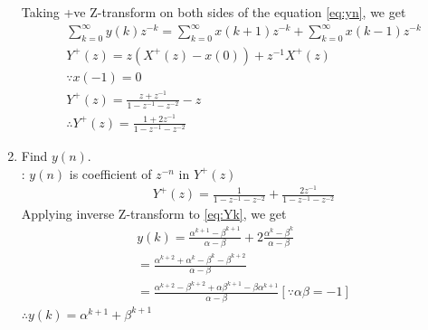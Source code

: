 \documentclass[journal,12pt,twocolumn]{IEEEtran}
\renewcommand\thesection{\arabic{section}}
\begin{document}
\begin{enumerate}[label=\thesection.\arabic*,ref=\thesection.\theenumi]
Taking +ve Z-transform on both sides of the equation \ref{eq:yn}, we get
\begin{align}
	&\sum_{k=0}^{\infty}y(k)z^{-k}=\sum_{k=0}^{\infty}x(k+1)z^{-k}+\sum_{k=0}^{\infty}x(k-1)z^{-k}\\
	&Y^{+}(z)=z(X^{+}(z)-x(0))+z^{-1}X^{+}(z)\\
	&\because x(-1)=0 \nonumber \\
	&Y^{+}(z)=\frac{z+z^{-1}}{1-z^{-1}-z^{-2}}-z\\
	&\therefore Y^{+}(z)=\frac{1+2z^{-1}}{1-z^{-1}-z^{-2}}
\end{align}
\item Find $y(n)$.\\
\solution:
 $y(n)$ is coefficient of $z^{-n}$ in $Y^{+}(z)$
\begin{align}
	\label{eq:Yk}
	&Y^{+}(z)=\frac{1}{1-z^{-1}-z^{-2}}+\frac{2z^{-1}}{1-z^{-1}-z^{-2}}
\end{align}
Applying inverse Z-transform to \ref{eq:Yk}, we get
\begin{align}
	&y(k)=\frac{\alpha^{k+1}-\beta^{k+1}}{\alpha - \beta} +2\frac{\alpha^{k}-\beta^{k}}{\alpha - \beta}\\
	&=\frac{\alpha^{k+2}+\alpha^{k}-\beta^{k}-\beta^{k+2}}{\alpha-\beta}\\
	&=\frac{\alpha^{k+2}-\beta^{k+2}+\alpha \beta^{k+1}-\beta \alpha^{k+1}}{\alpha-\beta} [\because \alpha \beta=-1]
\end{align}
$\therefore y(k)=\alpha^{k+1}+\beta^{k+1}$
\end{enumerate}
\end{document}
